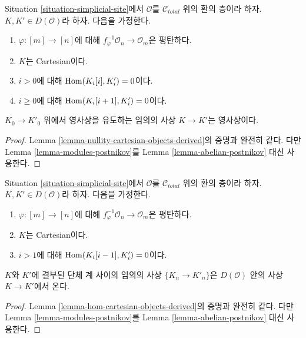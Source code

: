 \begin{lemma}
\label{lemma-nullity-cartesian-modules-derived}
Situation \ref{situation-simplicial-site}에서
$\mathcal{O}$를 $\mathcal{C}_{total}$ 위의 환의 층이라 하자.
$K, K' \in D(\mathcal{O})$라 하자.
다음을 가정한다.
\begin{enumerate}
\item $\varphi : [m] \to [n]$에 대해
$f_\varphi^{-1}\mathcal{O}_n \to \mathcal{O}_m$은 평탄하다.
\item $K$는 Cartesian이다.
\item $i > 0$에 대해 $\mathop{\mathrm{Hom}}\nolimits(K_i[i], K'_i) = 0$이다.
\item $i \geq 0$에 대해 $\mathop{\mathrm{Hom}}\nolimits(K_i[i + 1], K'_i) = 0$이다.
\end{enumerate}
$K_0 \to K'_0$ 위에서 영사상을 유도하는 임의의 사상
$K \to K'$는 영사상이다.
\end{lemma}

\begin{proof}
Lemma \ref{lemma-nullity-cartesian-objects-derived}의 증명과 완전히 같다.
다만 Lemma \ref{lemma-modules-postnikov}를
Lemma \ref{lemma-abelian-postnikov} 대신 사용한다.
\end{proof}

\begin{lemma}
\label{lemma-hom-cartesian-modules-derived}
Situation \ref{situation-simplicial-site}에서
$\mathcal{O}$를 $\mathcal{C}_{total}$ 위의 환의 층이라 하자.
$K, K' \in D(\mathcal{O})$라 하자.
다음을 가정한다.
\begin{enumerate}
\item $\varphi : [m] \to [n]$에 대해
$f_\varphi^{-1}\mathcal{O}_n \to \mathcal{O}_m$은 평탄하다.
\item $K$는 Cartesian이다.
\item $i > 1$에 대해 $\mathop{\mathrm{Hom}}\nolimits(K_i[i - 1], K'_i) = 0$이다.
\end{enumerate}
$K$와 $K'$에 결부된 단체 계 사이의 임의의 사상
$\{K_n \to K'_n\}$은 $D(\mathcal{O})$ 안의 사상 $K \to K'$에서 온다.
\end{lemma}

\begin{proof}
Lemma \ref{lemma-hom-cartesian-objects-derived}의 증명과 완전히 같다.
다만 Lemma \ref{lemma-modules-postnikov}를
Lemma \ref{lemma-abelian-postnikov} 대신 사용한다.
\end{proof}

